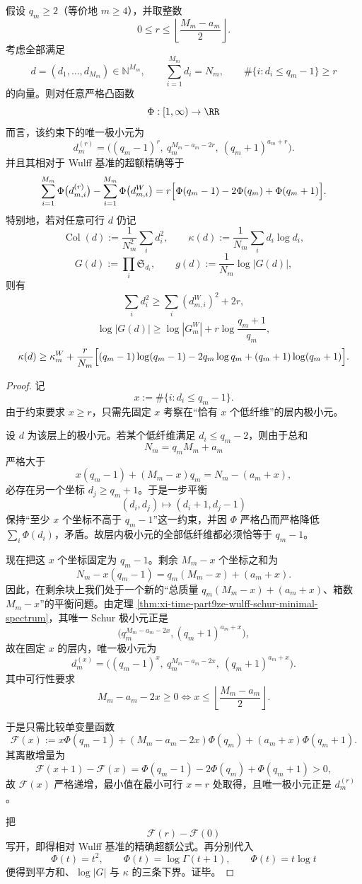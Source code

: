 \begin{theorem}[低纤维异常税的一般公式]\label{thm:xi-time-part9ze-lowfiber-anomaly-tax}
假设 \(q_m\ge 2\)（等价地 \(m\ge 4\)），并取整数
\[
0\le r\le \left\lfloor \frac{M_m-a_m}{2}\right\rfloor.
\]
考虑全部满足
\[
d=(d_1,\dots,d_{M_m})\in \mathbb N^{M_m},
\qquad
\sum_{i=1}^{M_m}d_i=N_m,
\qquad
\#\{i:d_i\le q_m-1\}\ge r
\]
的向量。则对任意严格凸函数
\[
\Phi:[1,\infty)\to \RR
\]
而言，该约束下的唯一极小元为
\[
d_m^{(r)}=
\bigl((q_m-1)^r,\ q_m^{M_m-a_m-2r},\ (q_m+1)^{a_m+r}\bigr).
\]
并且其相对于 Wulff 基准的超额精确等于
\[
\sum_{i=1}^{M_m}\Phi\bigl(d_{m,i}^{(r)}\bigr)
-
\sum_{i=1}^{M_m}\Phi\bigl(d_{m,i}^{W}\bigr)
=
r\Bigl[\Phi(q_m-1)-2\Phi(q_m)+\Phi(q_m+1)\Bigr].
\]
特别地，若对任意可行 \(d\) 仍记
\[
\operatorname{Col}(d):=\frac{1}{N_m^2}\sum_i d_i^2,
\qquad
\kappa(d):=\frac{1}{N_m}\sum_i d_i\log d_i,
\]
\[
G(d):=\prod_i\mathfrak S_{d_i},
\qquad
g(d):=\frac{1}{N_m}\log|G(d)|,
\]
则有
\[
\sum_i d_i^2\ge \sum_i(d_{m,i}^{W})^2+2r,
\]
\[
\log|G(d)|\ge \log|G_m^W|+r\log\frac{q_m+1}{q_m},
\]
\[
\kappa(d)\ge
\kappa_m^W+\frac{r}{N_m}
\Bigl[(q_m-1)\log(q_m-1)-2q_m\log q_m+(q_m+1)\log(q_m+1)\Bigr].
\]
\end{theorem}
\begin{proof}
记
\[
x:=\#\{i:d_i\le q_m-1\}.
\]
由于约束要求 \(x\ge r\)，只需先固定 \(x\) 考察在“恰有 \(x\) 个低纤维”的层内极小元。

设 \(d\) 为该层上的极小元。若某个低纤维满足 \(d_i\le q_m-2\)，则由于总和
\[
N_m=q_mM_m+a_m
\]
严格大于
\[
x(q_m-1)+(M_m-x)q_m
=N_m-(a_m+x),
\]
必存在另一个坐标 \(d_j\ge q_m+1\)。于是一步平衡
\[
(d_i,d_j)\mapsto (d_i+1,d_j-1)
\]
保持“至少 \(x\) 个坐标不高于 \(q_m-1\)”这一约束，并因 \(\Phi\) 严格凸而严格降低 \(\sum_i\Phi(d_i)\)，矛盾。故层内极小元的全部低纤维都必须恰等于 \(q_m-1\)。

现在把这 \(x\) 个坐标固定为 \(q_m-1\)。剩余 \(M_m-x\) 个坐标之和为
\[
N_m-x(q_m-1)=q_m(M_m-x)+(a_m+x).
\]
因此，在剩余块上我们处于一个新的“总质量 \(q_m(M_m-x)+(a_m+x)\)、箱数 \(M_m-x\)”的平衡问题。由定理 \ref{thm:xi-time-part9ze-wulff-schur-minimal-spectrum}，其唯一 Schur 极小元正是
\[
\bigl(q_m^{M_m-a_m-2x},(q_m+1)^{a_m+x}\bigr),
\]
故在固定 \(x\) 的层内，唯一极小元为
\[
d_m^{(x)}=
\bigl((q_m-1)^x,\ q_m^{M_m-a_m-2x},\ (q_m+1)^{a_m+x}\bigr).
\]
其中可行性要求
\[
M_m-a_m-2x\ge 0
\iff
x\le \left\lfloor \frac{M_m-a_m}{2}\right\rfloor.
\]

于是只需比较单变量函数
\[
\mathcal F(x):=
x\Phi(q_m-1)+(M_m-a_m-2x)\Phi(q_m)+(a_m+x)\Phi(q_m+1).
\]
其离散增量为
\[
\mathcal F(x+1)-\mathcal F(x)
=
\Phi(q_m-1)-2\Phi(q_m)+\Phi(q_m+1)>0,
\]
故 \(\mathcal F(x)\) 严格递增，最小值在最小可行 \(x=r\) 处取得，且唯一极小元正是 \(d_m^{(r)}\)。

把
\[
\mathcal F(r)-\mathcal F(0)
\]
写开，即得相对 Wulff 基准的精确超额公式。再分别代入
\[
\Phi(t)=t^2,\qquad
\Phi(t)=\log\Gamma(t+1),\qquad
\Phi(t)=t\log t
\]
便得到平方和、\(\log|G|\) 与 \(\kappa\) 的三条下界。证毕。
\end{proof}

